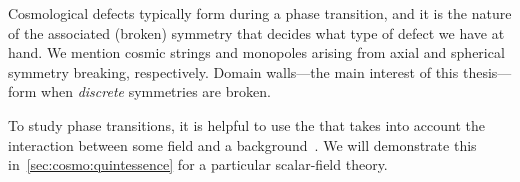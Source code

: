 


    
    Cosmological defects typically form during a phase transition, and it is the nature of the associated (broken) symmetry that decides what type of defect we have at hand. We mention cosmic strings and monopoles arising from axial and spherical symmetry breaking, respectively. Domain walls---the main interest of this thesis---form when \emph{discrete} symmetries are broken. 
    
    To study phase transitions, it is helpful to use the  that takes into account the interaction between some field and a background~\citep{vachaspatiKinksDomainWalls2006,kolbEarlyUniverse1990}. We will demonstrate this in~\cref{sec:cosmo:quintessence} for a particular scalar-field theory. %







